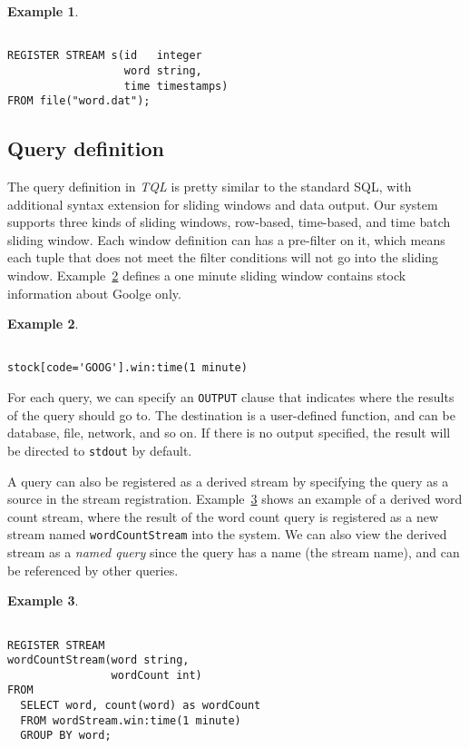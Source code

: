 \documentclass[conference, twocolumn, 11pt]{IEEEtran}
\theoremstyle{definition}
\newtheorem{example}{Example}[section]
\begin{document}
\begin{example}\label{reg-exmp}
\begin{verbatim}

REGISTER STREAM s(id   integer
                  word string, 
                  time timestamps)
FROM file("word.dat");
\end{verbatim}
\end{example}
\subsection{Query definition}\label{query-def}
The query definition in \emph{TQL} is pretty similar to the standard SQL, with additional syntax extension for sliding windows and data output. Our system supports three kinds of sliding windows, row-based, time-based, and time batch sliding window. Each window definition can has a pre-filter on it, which means each tuple that does not meet the filter conditions will not go into the sliding window. Example~\ref{win-exmp} defines a one minute sliding window contains stock information about Goolge only.

\begin{example}\label{win-exmp}
\begin{verbatim}

stock[code='GOOG'].win:time(1 minute)
\end{verbatim}
\end{example}

For each query, we can specify an \texttt{OUTPUT} clause that indicates where the results of the query should go to. The destination is a user-defined function, and can be database, file, network, and so on. If there is no output specified, the result will be directed to \texttt{stdout} by default.

A query can also be registered as a derived stream by specifying the query as a source in the stream registration. Example~\ref{named-exmp} shows an example of a derived word count stream, where the result of the word count query is registered as a new stream named \texttt{wordCountStream} into the system. We can also view the derived stream as a \emph{named query} since the query has a name (the stream name), and can be referenced by other queries.  

\begin{example}\label{named-exmp}
\begin{verbatim}

REGISTER STREAM
wordCountStream(word string, 
                wordCount int)
FROM
  SELECT word, count(word) as wordCount
  FROM wordStream.win:time(1 minute)
  GROUP BY word;
\end{verbatim}
\end{example}
\end{document}
